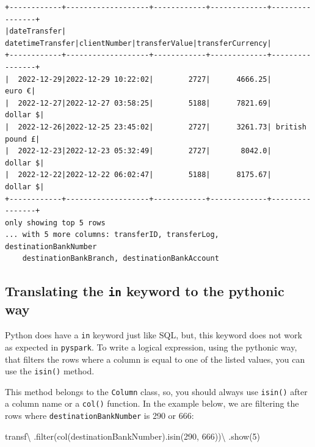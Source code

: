 \documentclass[
  11pt,
  letterpaper,
  DIV=11,
  numbers=noendperiod]{scrreprt}
\newenvironment{Shaded}{\begin{snugshade}}{\end{snugshade}}
\newcommand{\BuiltInTok}[1]{\textcolor[rgb]{0.00,0.23,0.31}{#1}}
\newcommand{\DecValTok}[1]{\textcolor[rgb]{0.68,0.00,0.00}{#1}}
\newcommand{\NormalTok}[1]{\textcolor[rgb]{0.00,0.23,0.31}{#1}}
\newcommand{\OperatorTok}[1]{\textcolor[rgb]{0.37,0.37,0.37}{#1}}
\newcommand{\StringTok}[1]{\textcolor[rgb]{0.13,0.47,0.30}{#1}}
\begin{document}
\begin{verbatim}
+------------+-------------------+------------+-------------+----------------+
|dateTransfer|   datetimeTransfer|clientNumber|transferValue|transferCurrency|
+------------+-------------------+------------+-------------+----------------+
|  2022-12-29|2022-12-29 10:22:02|        2727|      4666.25|          euro €|
|  2022-12-27|2022-12-27 03:58:25|        5188|      7821.69|        dollar $|
|  2022-12-26|2022-12-25 23:45:02|        2727|      3261.73| british pound £|
|  2022-12-23|2022-12-23 05:32:49|        2727|       8042.0|        dollar $|
|  2022-12-22|2022-12-22 06:02:47|        5188|      8175.67|        dollar $|
+------------+-------------------+------------+-------------+----------------+
only showing top 5 rows
... with 5 more columns: transferID, transferLog, destinationBankNumber
    destinationBankBranch, destinationBankAccount
\end{verbatim}

\hypertarget{translating-the-in-keyword-to-the-pythonic-way}{%
\subsection{\texorpdfstring{Translating the \texttt{in} keyword to the
pythonic
way}{Translating the in keyword to the pythonic way}}\label{translating-the-in-keyword-to-the-pythonic-way}}

Python does have a \texttt{in} keyword just like SQL, but, this keyword
does not work as expected in \texttt{pyspark}. To write a logical
expression, using the pythonic way, that filters the rows where a column
is equal to one of the listed values, you can use the \texttt{isin()}
method.

This method belongs to the \texttt{Column} class, so, you should always
use \texttt{isin()} after a column name or a \texttt{col()} function. In
the example below, we are filtering the rows where
\texttt{destinationBankNumber} is 290 or 666:

\begin{Shaded}
\begin{Highlighting}[]
\NormalTok{transf}\OperatorTok{\textbackslash{}}
\NormalTok{  .}\BuiltInTok{filter}\NormalTok{(col(}\StringTok{\textquotesingle{}destinationBankNumber\textquotesingle{}}\NormalTok{).isin(}\DecValTok{290}\NormalTok{, }\DecValTok{666}\NormalTok{))}\OperatorTok{\textbackslash{}}
\NormalTok{  .show(}\DecValTok{5}\NormalTok{)}
\end{Highlighting}
\end{Shaded}
\end{document}
